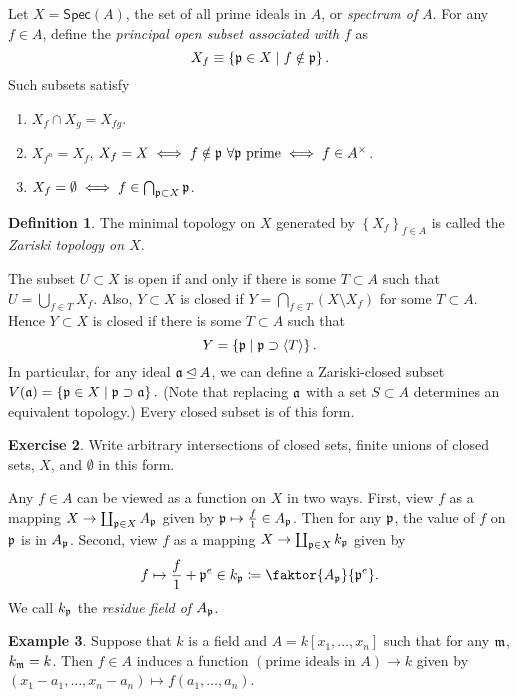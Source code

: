 \documentclass[10pt,letterpaper,cm]{nupset}
\theoremstyle{definition}
\newtheorem{definition}{Definition}[subsection]
\newtheorem{exmp}[definition]{Example}
\theoremstyle{theorem}
\newtheorem{exercise}[definition]{Exercise}
\theoremstyle{remark}
\newcommand{\1}{\mathbf{1}}
\newcommand{\p}{\frak{p}}
\newcommand{\0}{\vec 0}
\begin{document}
\medskip

 Let $X= \mathsf{Spec}(A)$, the set of all prime ideals in $A$, or \textit{spectrum of $A$}.  For any $f\in A$, define the \textit{principal open subset associated with $f$} as $$X_f \equiv \left\{ \p \in X \mid f\notin \p\right\}.$$  Such subsets satisfy 
\begin{enumerate}[label=(\alph*)]
\item $X_f \cap X_g = X_{fg}$.
\item $X_{f^n} = X_f$, $X_f = X \iff f\notin \p \ \forall \p \text{ prime} \iff f\in A^{\times}$.
\item $X_f = \emptyset \iff f \in \bigcap_{\p \subset X} \p$.
\end{enumerate}


\begin{definition}
The minimal topology on $X$ generated by $\left\{X_f\right\}_{f\in A}$ is called the \textit{Zariski topology on $X$}. 
\end{definition}


The subset $U\subset X$ is open if and only if there is some $T\subset A$ such that $U = \bigcup_{f\in T} X_f$. Also, $Y \subset X$ is closed if $Y = \bigcap_{f\in T} (X \setminus X_f)$ for some $T\subset A$.  Hence $Y \subset X$ is closed if there is some $T\subset A$ such that $$  Y = \left\{\p \mid \p \supset \left\langle T \right\rangle \right\}.$$ In particular,  for any ideal $\frak{a} \unlhd A$, we can define a Zariski-closed subset $V(\frak{a}) =  \left\{ \p \in X \mid  \p \supset \frak{a} \right\}.$ (Note that replacing $\frak{a}$ with a set $S\subset A$ determines an equivalent topology.) Every closed subset is of this form.


\begin{exercise}
Write arbitrary intersections of closed sets, finite unions of closed sets, $X$, and $\emptyset$ in this form.
\end{exercise}


Any $f\in A$ can be viewed as a function on $X$ in two ways. First, view $f$ as a mapping $X \to \coprod_{\p \in X} A_{\p}$ given by $\p \mapsto \frac{f}{1} \in A_{\p}$.  Then for any $\p$, the value of $f$ on $\p$ is in $A_{\p}$. Second, view $f$ as a mapping $X \to \coprod_{\p \in X} k_{\p}$ given by $$ f \mapsto \frac{f}{1} + \p^e \in k_{\p} \coloneqq \faktor{A_{\p}}{\p^e}.$$ We call $k_{\p}$ the \textit{residue field of $A_{\p}$}. 


\begin{exmp}
Suppose that $k$ is a field and $A = k[x_1, \ldots, x_n]$ such that for any $\frak{m}$, $k_{\frak{m}} = k$. Then  $f\in A$ induces a function $\left(\text{prime ideals in } A\right) \to k$ given by $\left(x_1 -a_1, \ldots, x_n -a_n\right) \mapsto f(a_1, \ldots, a_n)$.
\end{exmp}
\end{document}
